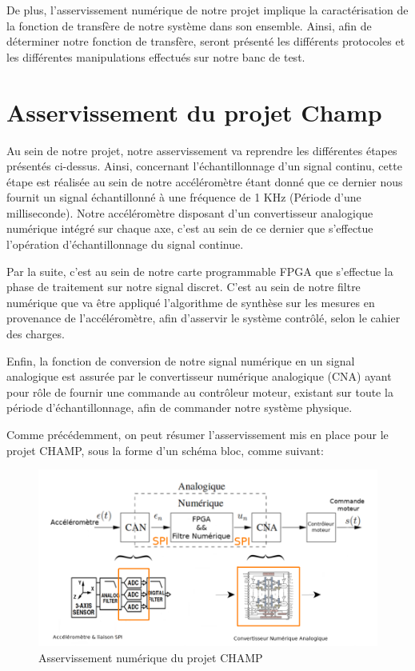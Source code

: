 \documentclass[french,a4paper,12pt]{report}
\begin{document}
	De plus, l'asservissement numérique de notre projet implique la caractérisation de la fonction de transfère de notre système dans son ensemble.
	Ainsi, afin de déterminer notre fonction de transfère, seront présenté les différents protocoles et les différentes manipulations effectués sur notre banc de test.

	\section{Asservissement du projet Champ}
	
		Au sein de notre projet, notre asservissement va reprendre les différentes étapes présentés ci-dessus. Ainsi, concernant l'échantillonnage d'un signal continu, cette étape est réalisée au sein de notre accéléromètre étant donné que ce dernier nous fournit un signal échantillonné à une fréquence de 1 KHz (Période d'une milliseconde). Notre accéléromètre disposant d'un convertisseur analogique numérique intégré sur chaque axe, c'est au sein de ce dernier que s'effectue l'opération d'échantillonnage du signal continue.
		
		Par la suite, c'est au sein de notre carte programmable FPGA que s'effectue la phase de traitement sur notre signal discret. C'est au sein de notre filtre numérique que va être appliqué l'algorithme de synthèse sur les mesures en provenance de l'accéléromètre, afin d'asservir le système contrôlé, selon le cahier des charges.
				
		Enfin, la fonction de conversion de notre signal numérique en un signal analogique est assurée par le convertisseur numérique analogique (CNA) ayant pour rôle de fournir une commande au contrôleur moteur, existant sur toute la période d'échantillonnage, afin de commander notre système physique.
		
		Comme précédemment, on peut résumer l'asservissement mis en place pour le projet CHAMP, sous la forme d'un schéma bloc, comme suivant:
		
	\begin{figure}[!ht]
    \center
  	\includegraphics[width=17cm]{Assert_2.png}
    \caption{Asservissement numérique du projet CHAMP}
	\end{figure}	
		
\end{document}
